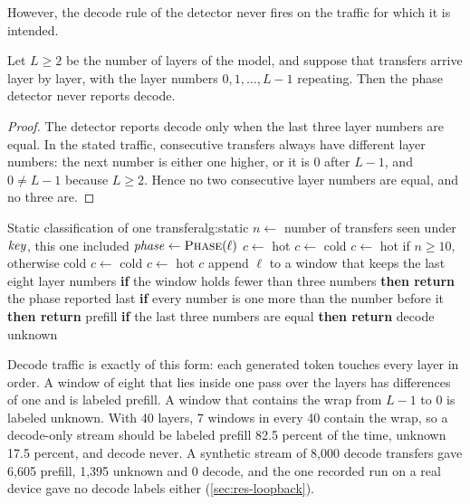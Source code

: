 However, the decode rule of the detector never fires on the traffic for which
it is intended.

\begin{proposition}
\label{prop:nodecode}%
Let $L \ge 2$ be the number of layers of the model, and suppose that
transfers arrive layer by layer, with the layer numbers $0, 1, \dots, L-1$
repeating. Then the phase detector never reports decode.
\end{proposition}

\begin{proof}
The detector reports decode only when the last three layer numbers are equal.
In the stated traffic, consecutive transfers always have different layer
numbers: the next number is either one higher, or it is $0$ after $L-1$, and
$0 \ne L-1$ because $L \ge 2$. Hence no two consecutive layer numbers are equal,
and no three are.
\end{proof}

\begin{pseudocode}{Static classification of one transfer}{alg:static}
    \State $n \gets$ number of transfers seen under $\mathit{key}$, this one included
    \State $\var{phase} \gets \Call{Phase}{\ell}$
      \State $c \gets$ hot
      \State $c \gets$ cold
    \Else
      \State $c \gets$ hot if $n \ge 10$, otherwise cold
    \EndIf
      \State $c \gets$ cold
      \State $c \gets$ hot
    \EndIf
    \State \Return $c$
  \EndFunction
    \State append $\ell$ to a window that keeps the last eight layer numbers
    \State \textbf{if} the window holds fewer than three numbers \textbf{then return} the phase reported last
    \State \textbf{if} every number is one more than the number before it \textbf{then return} prefill
    \State \textbf{if} the last three numbers are equal \textbf{then return} decode
    \State \Return unknown
  \EndFunction
\end{pseudocode}

Decode traffic is exactly of this form: each generated token touches every
layer in order. A window of eight that lies inside one pass over the layers
has differences of one and is labeled prefill. A window that contains the
wrap from $L-1$ to $0$ is labeled unknown. With 40 layers, 7 windows in
every 40 contain the wrap, so a decode-only stream should be labeled prefill
82.5 percent of the time, unknown 17.5 percent, and decode never. A synthetic
stream of 8,000 decode transfers gave 6,605 prefill, 1,395 unknown and 0
decode, and the one recorded run on a real device gave no decode labels
either (\cref{sec:res-loopback}).

